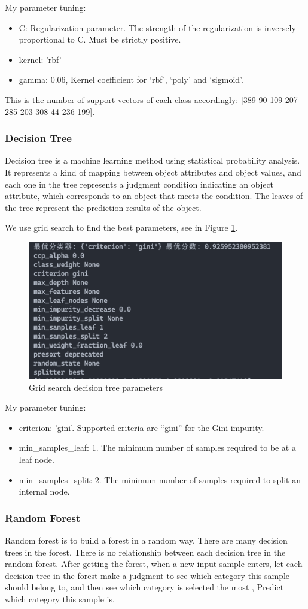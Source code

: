 \documentclass[11pt,en]{elegantpaper}
\begin{document}
My parameter tuning:
\begin{itemize}
	\item C: Regularization parameter. The strength of the regularization is inversely proportional to C. Must be strictly positive. 
	\item kernel: 'rbf'
	\item gamma: 0.06, Kernel coefficient for ‘rbf’, ‘poly’ and ‘sigmoid’.


\end{itemize}


This is the number of support vectors of each class accordingly: [389  90 109 207 285 203 308  44 236 199].
\subsubsection{Decision Tree}
Decision tree is a machine learning method using statistical probability analysis. It represents a kind of mapping between object attributes and object values, and each one in the tree represents a judgment condition indicating an object attribute, which corresponds to an object that meets the condition. The leaves of the tree represent the prediction results of the object.

We use grid search to find the best parameters, see in Figure \ref{bestdt}.
\begin{figure}[h]
	\centering
	\includegraphics[width=.5\textwidth]{image/bestdt}
	\caption{Grid search decision tree parameters}
	\label{bestdt}
\end{figure}

My parameter tuning:
\begin{itemize}
	\item criterion: 'gini'. Supported criteria are “gini” for the Gini impurity.
	\item min\_samples\_leaf: 1. The minimum number of samples required to be at a leaf node. 
	\item min\_samples\_split: 2. The minimum number of samples required to split an internal node.
\end{itemize}


\subsubsection{Random Forest}
Random forest is to build a forest in a random way. There are many decision trees in the forest. There is no relationship between each decision tree in the random forest. After getting the forest, when a new input sample enters, let each decision tree in the forest make a judgment to see which category this sample should belong to, and then see which category is selected the most , Predict which category this sample is.
\end{document}
